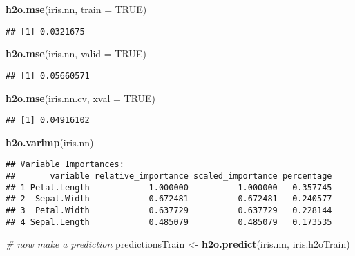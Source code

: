 \documentclass[
]{book}
\newenvironment{Shaded}{\begin{snugshade}}{\end{snugshade}}
\newcommand{\CommentTok}[1]{\textcolor[rgb]{0.56,0.35,0.01}{\textit{#1}}}
\newcommand{\DataTypeTok}[1]{\textcolor[rgb]{0.13,0.29,0.53}{#1}}
\newcommand{\KeywordTok}[1]{\textcolor[rgb]{0.13,0.29,0.53}{\textbf{#1}}}
\newcommand{\NormalTok}[1]{#1}
\newcommand{\OtherTok}[1]{\textcolor[rgb]{0.56,0.35,0.01}{#1}}
\newcommand{\StringTok}[1]{\textcolor[rgb]{0.31,0.60,0.02}{#1}}
\begin{document}
\begin{Shaded}
\begin{Highlighting}[]
\KeywordTok{h2o.mse}\NormalTok{(iris.nn, }\DataTypeTok{train =} \OtherTok{TRUE}\NormalTok{)}
\end{Highlighting}
\end{Shaded}

\begin{verbatim}
## [1] 0.0321675
\end{verbatim}

\begin{Shaded}
\begin{Highlighting}[]
\KeywordTok{h2o.mse}\NormalTok{(iris.nn, }\DataTypeTok{valid =} \OtherTok{TRUE}\NormalTok{)}
\end{Highlighting}
\end{Shaded}

\begin{verbatim}
## [1] 0.05660571
\end{verbatim}

\begin{Shaded}
\begin{Highlighting}[]
\KeywordTok{h2o.mse}\NormalTok{(iris.nn.cv, }\DataTypeTok{xval =} \OtherTok{TRUE}\NormalTok{)}
\end{Highlighting}
\end{Shaded}

\begin{verbatim}
## [1] 0.04916102
\end{verbatim}

\begin{Shaded}
\begin{Highlighting}[]
\KeywordTok{h2o.varimp}\NormalTok{(iris.nn)}
\end{Highlighting}
\end{Shaded}

\begin{verbatim}
## Variable Importances: 
##       variable relative_importance scaled_importance percentage
## 1 Petal.Length            1.000000          1.000000   0.357745
## 2  Sepal.Width            0.672481          0.672481   0.240577
## 3  Petal.Width            0.637729          0.637729   0.228144
## 4 Sepal.Length            0.485079          0.485079   0.173535
\end{verbatim}

\begin{Shaded}
\begin{Highlighting}[]
\CommentTok{# now make a prediction}
\NormalTok{predictionsTrain <-}\StringTok{ }\KeywordTok{h2o.predict}\NormalTok{(iris.nn, iris.h2oTrain)}
\end{Highlighting}
\end{Shaded}
\end{document}
